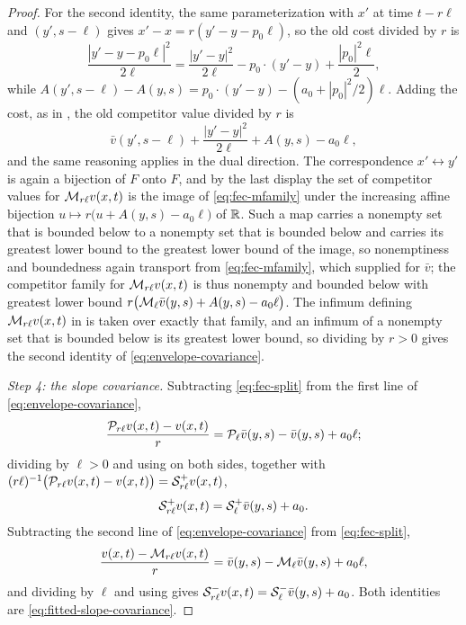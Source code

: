 \begin{proof}
For the second identity, the same parameterization with $x'$ at time
$t-r\ell$ and $(y',s-\ell)$ gives $x'-x=r(y'-y-p_0\ell)$, so the old cost
divided by $r$ is
\[
  \frac{|y'-y-p_0\ell|^2}{2\ell}
   =\frac{|y'-y|^2}{2\ell}-p_0\cdot(y'-y)+\frac{|p_0|^2\ell}{2},
\]
while $A(y',s-\ell)-A(y,s)=p_0\cdot(y'-y)-(a_0+|p_0|^2/2)\ell$. Adding the cost,
as in , the old competitor value divided by $r$ is
\[
  \bar v(y',s-\ell)+\frac{|y'-y|^2}{2\ell}+A(y,s)-a_0\ell ,
\]
and the same reasoning applies in the dual direction. The correspondence
$x'\leftrightarrow y'$ is again a bijection of $F$ onto $F$, and by the last
display the set of competitor values for $\mathcal{M}_{r\ell}v(x,t)$ is the image of
\eqref{eq:fec-mfamily} under the increasing affine bijection
$u\mapsto r\bigl(u+A(y,s)-a_0\ell\bigr)$ of $\mathbb{R}$. Such a map carries a nonempty
set that is bounded below to a nonempty set that is bounded below and carries
its greatest lower bound to the greatest lower bound of the image, so
nonemptiness and boundedness again transport from \eqref{eq:fec-mfamily}, which
 supplied for $\bar v$; the competitor family
for $\mathcal{M}_{r\ell}v(x,t)$ is thus nonempty and bounded below with greatest lower
bound $r\bigl(\mathcal{M}_\ell\bar v(y,s)+A(y,s)-a_0\ell\bigr)$. The infimum defining
$\mathcal{M}_{r\ell}v(x,t)$ in  is taken over exactly that family,
and an infimum of a nonempty set that is bounded below is its greatest lower
bound, so dividing by $r>0$ gives the second identity of
\eqref{eq:envelope-covariance}.

\emph{Step 4: the slope covariance.}
Subtracting \eqref{eq:fec-split} from the first line of
\eqref{eq:envelope-covariance},
\[
  \frac{\mathcal{P}_{r\ell}v(x,t)-v(x,t)}{r}
   =\mathcal{P}_\ell\bar v(y,s)-\bar v(y,s)+a_0\ell ;
\]
dividing by $\ell>0$ and using  on both sides, together with
$(r\ell)^{-1}\bigl(\mathcal{P}_{r\ell}v(x,t)-v(x,t)\bigr)=\mathcal{S}^+_{r\ell}v(x,t)$,
\[
  \mathcal{S}_{r\ell}^+v(x,t)=\mathcal{S}_\ell^+\bar v(y,s)+a_0 .
\]
Subtracting the second line of \eqref{eq:envelope-covariance} from
\eqref{eq:fec-split},
\[
  \frac{v(x,t)-\mathcal{M}_{r\ell}v(x,t)}{r}
   =\bar v(y,s)-\mathcal{M}_\ell\bar v(y,s)+a_0\ell ,
\]
and dividing by $\ell$ and using  gives
$\mathcal{S}_{r\ell}^-v(x,t)=\mathcal{S}_\ell^-\bar v(y,s)+a_0$. Both identities are
\eqref{eq:fitted-slope-covariance}.
\end{proof}
